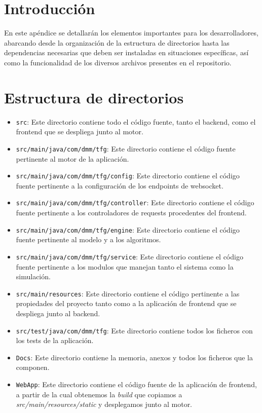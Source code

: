 \section{Introducción}
En este apéndice se detallarán los elementos importantes para los desarrolladores, abarcando desde la organización de la estructura de directorios hasta las dependencias necesarias que deben ser instaladas en situaciones específicas, así como la funcionalidad de los diversos archivos presentes en el repositorio.
\section{Estructura de directorios}
\begin{itemize}
    \item \verb|src|:
    Este directorio contiene todo el código fuente, tanto el backend, como el frontend que se despliega junto al motor.
    \item \verb|src/main/java/com/dmm/tfg|: 
    Este directorio contiene el código fuente pertinente al motor de la aplicación.
    \item \verb|src/main/java/com/dmm/tfg/config|: 
    Este directorio contiene el código fuente pertinente a la configuración de los endpoints de websocket.
    \item \verb|src/main/java/com/dmm/tfg/controller|: 
    Este directorio contiene el código fuente pertinente a los controladores de requests procedentes del frontend.
    \item \verb|src/main/java/com/dmm/tfg/engine|: 
    Este directorio contiene el código fuente pertinente al modelo y a los algoritmos.
    \item \verb|src/main/java/com/dmm/tfg/service|: 
    Este directorio contiene el código fuente pertinente a los modulos que manejan tanto el sistema como la simulación.
    \item \verb|src/main/resources|: 
    Este directorio contiene el código pertinente a las propiedades del proyecto tanto como a la aplicación de frontend que se despliega junto al backend.
    \item \verb|src/test/java/com/dmm/tfg|: 
    Este directorio contiene todos los ficheros con los tests de la aplicación.
    \item \verb|Docs|: 
    Este directorio contiene la memoria, anexos y todos los ficheros que la componen.
    \item \verb|WebApp|: 
    Este directorio contiene el código fuente de la aplicación de frontend, a partir de la cual obtenemos la \textit{build} que copiamos a \textit{src/main/resources/static} y desplegamos junto al motor.

\end{itemize}
